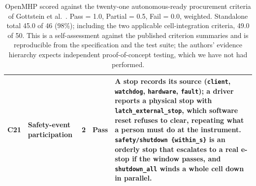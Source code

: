 \begin{table}[p]
\begin{tabular}{@{}llcc p{6.6cm}@{}}
C21 & Safety-event participation & 2 & \textbf{Pass} & A stop records its source (\texttt{client}, \texttt{watchdog}, \texttt{hardware}, \texttt{fault}); a driver reports a physical stop with \texttt{latch\_external\_stop}, which software reset refuses to clear, repeating what a person must do at the instrument. \texttt{safety/shutdown \{within\_s\}} is an orderly stop that escalates to a real e-stop if the window passes, and \texttt{shutdown\_all} winds a whole cell down in parallel. \\
\bottomrule
\end{tabular}
\caption{OpenMHP scored against the twenty-one autonomous-ready procurement criteria of
Gottstein et al.~\cite{gottstein2026}. Pass = 1.0, Partial = 0.5, Fail = 0.0, weighted.
Standalone total 45.0 of 46 (98\%); including the two applicable cell-integration criteria,
49.0 of 50. This is a self-assessment against the published criterion summaries and is
reproducible from the specification and the test suite; the authors' evidence hierarchy
expects independent proof-of-concept testing, which we have not had performed.}
\label{tab:scorecard}
\end{table}
